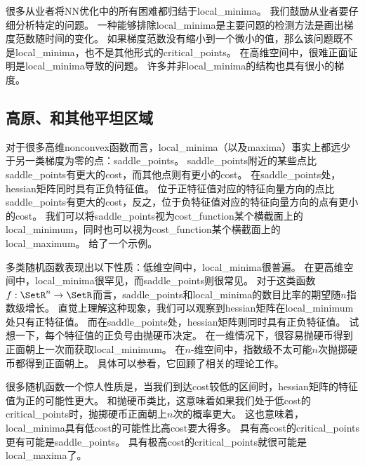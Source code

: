 很多从业者将\gls{NN}优化中的所有困难都归结于\gls{local_minima}。
我们鼓励从业者要仔细分析特定的问题。
一种能够排除\gls{local_minima}是主要问题的检测方法是画出梯度范数随时间的变化。
如果梯度范数没有缩小到一个微小的值，那么该问题既不是\gls{local_minima}，也不是其他形式的\gls{critical_points}。
在高维空间中，很难正面证明是\gls{local_minima}导致的问题。
许多并非\gls{local_minima}的结构也具有很小的梯度。

\subsection{高原、和其他平坦区域}
\label{sec:plateaus_saddle_points_and_other_flat_regions}
对于很多高维\gls{nonconvex}函数而言，\gls{local_minima}（以及\gls{maxima}）事实上都远少于另一类梯度为零的点：\gls{saddle_points}。
\gls{saddle_points}附近的某些点比\gls{saddle_points}有更大的\gls{cost}，而其他点则有更小的\gls{cost}。
在\gls{saddle_points}处，\gls{hessian}矩阵同时具有正负特征值。
位于正特征值对应的特征向量方向的点比\gls{saddle_points}有更大的\gls{cost}，反之，位于负特征值对应的特征向量方向的点有更小的\gls{cost}。
我们可以将\gls{saddle_points}视为\gls{cost_function}某个横截面上的\gls{local_minimum}，同时也可以视为\gls{cost_function}某个横截面上的\gls{local_maximum}。
给了一个示例。


多类随机函数表现出以下性质：低维空间中，\gls{local_minima}很普遍。
在更高维空间中，\gls{local_minima}很罕见，而\gls{saddle_points}则很常见。
对于这类函数$f:\SetR^n \to \SetR$而言，\gls{saddle_points}和\gls{local_minima}的数目比率的期望随$n$指数级增长。
直觉上理解这种现象，我们可以观察到\gls{hessian}矩阵在\gls{local_minimum}处只有正特征值。
而在\gls{saddle_points}处，\gls{hessian}矩阵则同时具有正负特征值。
试想一下，每个特征值的正负号由抛硬币决定。
在一维情况下，很容易抛硬币得到正面朝上一次而获取\gls{local_minimum}。
在$n$-维空间中，指数级不太可能$n$次抛掷硬币都得到正面朝上。
具体可以参看\cite{Dauphin-et-al-NIPS2014-small}，它回顾了相关的理论工作。


很多随机函数一个惊人性质是，当我们到达\gls{cost}较低的区间时，\gls{hessian}矩阵的特征值为正的可能性更大。
和抛硬币类比，这意味着如果我们处于低\gls{cost}的\gls{critical_points}时，抛掷硬币正面朝上$n$次的概率更大。
这也意味着，\gls{local_minima}具有低\gls{cost}的可能性比高\gls{cost}要大得多。
具有高\gls{cost}的\gls{critical_points}更有可能是\gls{saddle_points}。
具有极高\gls{cost}的\gls{critical_points}就很可能是\gls{local_maxima}了。


